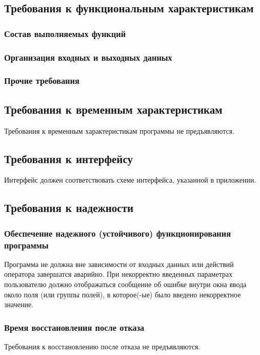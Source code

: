 

\subsection{Требования к функциональным характеристикам}
\subsubsection{Состав выполняемых функций}
\subsubsection{Организация входных и выходных данных}
\subsubsection{Прочие требования}


\subsection{Требования к временным характеристикам}
Требования к временным характеристикам программы не предъявляются.

\subsection{Требования к интерфейсу}
Интерфейс должен соответствовать схеме интерфейса, указанной в приложении.

\subsection{Требования к надежности}
\subsubsection{Обеспечение надежного (устойчивого) функционирования программы}
Программа не должна вне зависимости от входных данных или действий оператора завершатся аварийно. При некорректно введенных параметрах пользователю должно отображаться сообщение об ошибке внутри окна ввода около поля (или группы полей), в которое(-ые) было введено некорректное значение.
\subsubsection{Время восстановления после отказа}
Требования к восстановлению после отказа не предъявляются.

